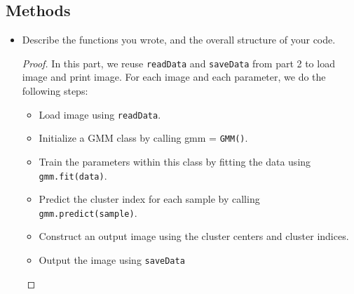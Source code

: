 \documentclass[12pt]{article}
\newcommand{\1}{\mathbf{1}}
\begin{document}
{\subsection{Methods}
\begin{itemize}
  \item Describe the functions you wrote, and the overall structure of your code.
  \begin{proof}
    In this part, we reuse {\tt readData} and {\tt saveData} from part 2 to load image and print image. For each image and each parameter, we do the following steps:
    \begin{itemize}
      \item Load image using {\tt readData}.
      \item Initialize a GMM class by calling {gmm = \tt GMM()}.
      \item Train the parameters within this class by fitting the data using {\tt gmm.fit(data)}.
      \item Predict the cluster index for each sample by calling {\tt gmm.predict(sample)}.
      \item Construct an output image using the cluster centers and cluster indices.
      \item Output the image using {\tt saveData}
    \end{itemize}
  \end{proof}
\end{itemize}

}
\end{document}

